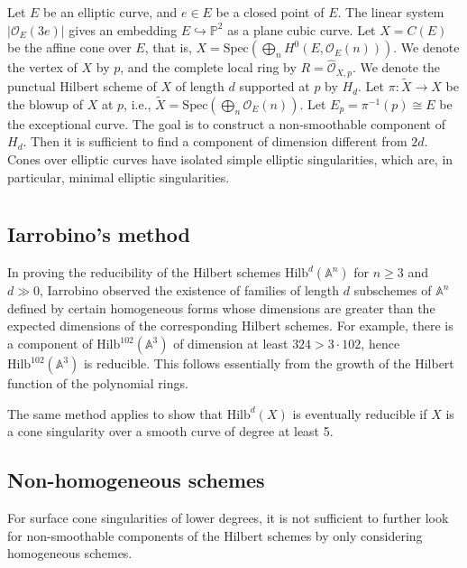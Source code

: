 \documentclass[12pt,oneside,reqno]{amsart}
\theoremstyle{definition}
\begin{document}
Let $E$ be an elliptic curve, and $e \in E$ be a closed point of $E$. The linear system $\vert \mathcal{O}_E(3e) \vert$ gives an embedding $E \hookrightarrow \mathbb{P}^2$ as a plane cubic curve. Let $X = C(E)$ be the affine cone over $E$, that is, $X = \mathrm{Spec}(\bigoplus_n H^0(E, \mathcal{O}_E(n)))$. We denote the vertex of $X$ by $p$, and the complete local ring by $R = \hat{\mathcal{O}}_{X, p}$. We denote the punctual Hilbert scheme of $X$ of length $d$ supported at $p$ by $H_d$. Let $\pi: \tilde{X} \to X$ be the blowup of $X$ at $p$, i.e., $\tilde{X} = \mathrm{Spec}(\bigoplus_n \mathcal{O}_E(n))$. Let $E_p = \pi^{-1}(p) \cong E$ be the exceptional curve. The goal is to construct a non-smoothable component of $H_d$. Then it is sufficient to find a component of dimension different from $2d$. Cones over elliptic curves have isolated simple elliptic singularities, which are, in particular, minimal elliptic singularities. 

\section{}
\subsection{Iarrobino's method}
In proving the reducibility of the Hilbert schemes $\mathrm{Hilb}^d(\mathbb{A}^n)$ for $n \geq 3$ and $d \gg 0$, Iarrobino observed the existence of families of length $d$ subschemes of $\mathbb{A}^n$ defined by certain homogeneous forms whose dimensions are greater than the expected dimensions of the corresponding Hilbert schemes. For example, there is a component of $\mathrm{Hilb}^{102}(\mathbb{A}^3)$ of dimension at least $324 > 3 \cdot 102$, hence $\mathrm{Hilb}^{102}(\mathbb{A}^3)$ is reducible. This follows essentially from the growth of the Hilbert function of the polynomial rings. 

The same method applies to show that $\mathrm{Hilb}^{d}(X)$ is eventually reducible if $X$ is a cone singularity over a smooth curve of degree at least 5. 

\subsection{Non-homogeneous schemes}
For surface cone singularities of lower degrees, it is not sufficient to further look for non-smoothable components of the Hilbert schemes by only considering homogeneous schemes. 
\end{document}
